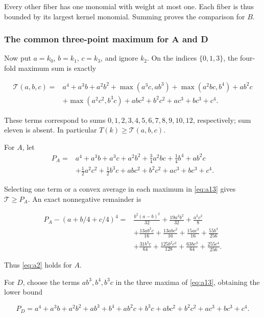 Every other fiber has one monomial with weight at most one. Each fiber is thus
bounded by its largest kernel monomial. Summing proves the comparison for \(B\).

\subsubsection{The common three-point maximum for A and D}

Now put \(a=k_0\), \(b=k_1\), \(c=k_3\), and ignore \(k_2\). On the
indices \(\{0,1,3\}\), the four-fold maximum sum is exactly

\begin{equation}\label{eq:a13}
\begin{aligned}
\mathcal T(a,b,c)={}&a^4+a^3b+a^2b^2
+\max(a^3c,ab^3)+\max(a^2bc,b^4)+ab^2c\\
&+\max(a^2c^2,b^3c)+abc^2+b^2c^2+ac^3+bc^3+c^4.
\end{aligned}
\end{equation}

These terms correspond to sums \(0,1,2,3,4,5,6,7,8,9,10,12\), respectively;
sum eleven is absent. In particular \(T(k)\ge\mathcal T(a,b,c)\).

For \(A\), let
\[
\begin{aligned}
P_A={}&a^4+a^3b+a^3c+a^2b^2
+\tfrac34a^2bc+\tfrac14b^4+ab^2c\\
&+\tfrac12a^2c^2+\tfrac12b^3c
+abc^2+b^2c^2+ac^3+bc^3+c^4.
\end{aligned}
\]

Selecting one term or a convex average in each maximum in \eqref{eq:a13} gives
\(\mathcal T\ge P_A\). An exact nonnegative remainder is

\begin{equation}\label{eq:a14}
\begin{aligned}
P_A-(a+b/4+c/4)^4={}&\frac{b^2(a-b)^2}{32}
+\frac{19a^2b^2}{32}+\frac{a^2c^2}{8}\\
&+\frac{13ab^2c}{16}+\frac{13abc^2}{16}
+\frac{15ac^3}{16}+\frac{55b^4}{256}\\
&+\frac{31b^3c}{64}+\frac{125b^2c^2}{128}
+\frac{63bc^3}{64}+\frac{255c^4}{256}.
\end{aligned}
\end{equation}

Thus \eqref{eq:a2} holds for \(A\).

For \(D\), choose the terms \(ab^3,b^4,b^3c\) in the three maxima of
\eqref{eq:a13}, obtaining the lower bound

\[
P_D=a^4+a^3b+a^2b^2+ab^3+b^4+ab^2c+b^3c
+abc^2+b^2c^2+ac^3+bc^3+c^4.
\]

